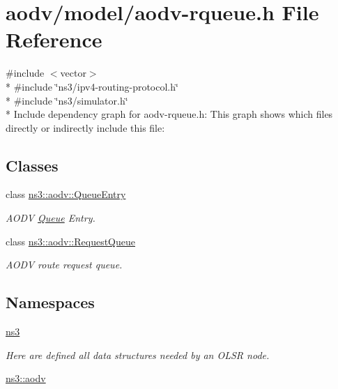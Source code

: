 \hypertarget{aodv-rqueue_8h}{}\section{aodv/model/aodv-\/rqueue.h File Reference}
\label{aodv-rqueue_8h}
{\ttfamily \#include $<$vector$>$}\\*
{\ttfamily \#include \char`\"{}ns3/ipv4-\/routing-\/protocol.\+h\char`\"{}}\\*
{\ttfamily \#include \char`\"{}ns3/simulator.\+h\char`\"{}}\\*
Include dependency graph for aodv-\/rqueue.h\+:
This graph shows which files directly or indirectly include this file\+:
\subsection*{Classes}
\begin{DoxyCompactItemize}
\item 
class \hyperlink{classns3_1_1aodv_1_1QueueEntry}{ns3\+::aodv\+::\+Queue\+Entry}
\begin{DoxyCompactList}\small\item\em A\+O\+DV \hyperlink{classns3_1_1Queue}{Queue} Entry. \end{DoxyCompactList}\item 
class \hyperlink{classns3_1_1aodv_1_1RequestQueue}{ns3\+::aodv\+::\+Request\+Queue}
\begin{DoxyCompactList}\small\item\em A\+O\+DV route request queue. \end{DoxyCompactList}\end{DoxyCompactItemize}
\subsection*{Namespaces}
\begin{DoxyCompactItemize}
\item 
 \hyperlink{namespacens3}{ns3}
\begin{DoxyCompactList}\small\item\em Here are defined all data structures needed by an O\+L\+SR node. \end{DoxyCompactList}\item 
 \hyperlink{namespacens3_1_1aodv}{ns3\+::aodv}
\end{DoxyCompactItemize}
